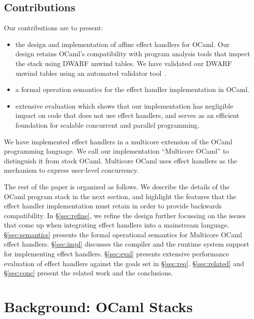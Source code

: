 \documentclass[sigplan,10pt,review,anonymous]{acmart}\settopmatter{printfolios=true,printccs=false,printacmref=false}
\begin{document}
\subsection{Contributions}

Our contributions are to present:

\begin{itemize}
	\item the design and implementation of affine effect handlers for OCaml. Our
		design retains OCaml's compatibility with program analysis tools that
		inspect the stack using DWARF unwind tables. We have validated our DWARF
		unwind tables using an automated validator tool~\cite{}.
	\item a formal operation semantics for the effect handler implementation in
		OCaml.
	\item extensive evaluation which shows that our implementation has negligible
		impact on code that does not use effect handlers, and serves as an
		efficient foundation for scalable concurrent and parallel programming.
\end{itemize}

We have implemented effect handlers in a multicore extension of the OCaml
programming language. We call our implementation ``Multicore OCaml'' to
distinguish it from stock OCaml. Multicore OCaml uses effect handlers as the
mechanism to express user-level concurrency.

The rest of the paper is organized as follows. We describe the details of the
OCaml program stack in the next section, and highlight the features that the
effect handler implementation must retain in order to provide backwards
compatibility. In \S\ref{sec:refine}, we refine the design further
focussing on the issues that come up when integrating effect handlers into a
mainstream language. \S\ref{sec:semantics} presents the formal operational
semantics for Multicore OCaml effect handlers. \S\ref{sec:impl} discusses the
compiler and the runtime system support for implementing effect handlers.
\S\ref{sec:eval} presents extensive performance evaluation of effect handlers
against the goals set in \S\ref{sec:req}. \S\ref{sec:related} and
\S\ref{sec:conc} present the related work and the conclusions.

\section{Background: OCaml Stacks}
\label{sec:stack}
\end{document}
